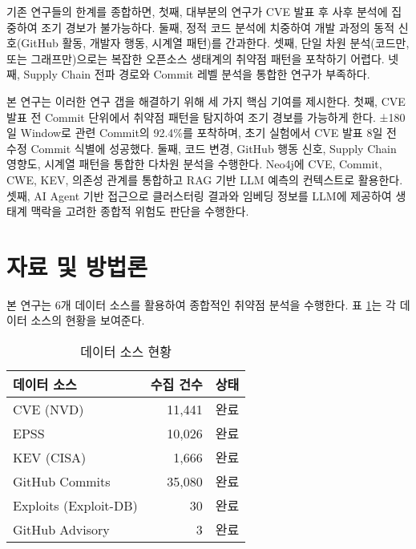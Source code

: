 ﻿\documentclass[conference]{IEEEtran}
\begin{document}
기존 연구들의 한계를 종합하면, 첫째, 대부분의 연구가 CVE 발표 후 사후 분석에 집중하여 조기 경보가 불가능하다. 둘째, 정적 코드 분석에 치중하여 개발 과정의 동적 신호(GitHub 활동, 개발자 행동, 시계열 패턴)를 간과한다. 셋째, 단일 차원 분석(코드만, 또는 그래프만)으로는 복잡한 오픈소스 생태계의 취약점 패턴을 포착하기 어렵다. 넷째, Supply Chain 전파 경로와 Commit 레벨 분석을 통합한 연구가 부족하다.

본 연구는 이러한 연구 갭을 해결하기 위해 세 가지 핵심 기여를 제시한다. 첫째, CVE 발표 전 Commit 단위에서 취약점 패턴을 탐지하여 조기 경보를 가능하게 한다. ±180일 Window로 관련 Commit의 92.4\%를 포착하며, 초기 실험에서 CVE 발표 8일 전 수정 Commit 식별에 성공했다. 둘째, 코드 변경, GitHub 행동 신호, Supply Chain 영향도, 시계열 패턴을 통합한 다차원 분석을 수행한다. Neo4j에 CVE, Commit, CWE, KEV, 의존성 관계를 통합하고 RAG 기반 LLM 예측의 컨텍스트로 활용한다. 셋째, AI Agent 기반 접근으로 클러스터링 결과와 임베딩 정보를 LLM에 제공하여 생태계 맥락을 고려한 종합적 위험도 판단을 수행한다.


\section{자료 및 방법론}

본 연구는 6개 데이터 소스를 활용하여 종합적인 취약점 분석을 수행한다. 표 \ref{tab:data_sources}는 각 데이터 소스의 현황을 보여준다.

\begin{table}[h]
\centering
\caption{데이터 소스 현황}
\label{tab:data_sources}
\begin{tabular}{lrr}
\toprule
\textbf{데이터 소스} & \textbf{수집 건수} & \textbf{상태} \\
\midrule
CVE (NVD) & 11,441 & 완료 \\
EPSS & 10,026 & 완료 \\
KEV (CISA) & 1,666 & 완료 \\
GitHub Commits & 35,080 & 완료 \\
Exploits (Exploit-DB) & 30 & 완료 \\
GitHub Advisory & 3 & 완료 \\
\bottomrule
\end{tabular}
\end{table}
\end{document}
